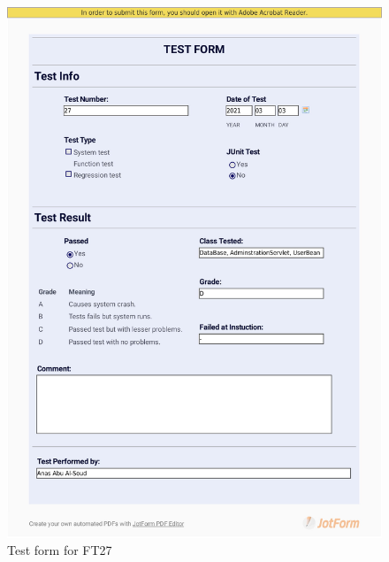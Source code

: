 \documentclass{article}
\begin{document}
 \begin{figure}
     \centering
     \includegraphics[width=13cm]{images/2021-03-03_Anas_FT27-1}
     \renewcommand\figurename{Figure}
     \caption{Test form for FT27}
     \label{fig:my_label}
 \end{figure}
 
\end{document}
